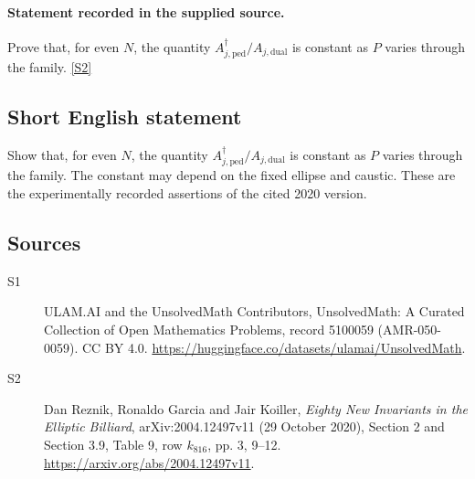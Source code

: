 \documentclass[11pt]{article}
\newcommand{\sref}[2]{\hyperlink{source:#1:#2}{[S#2]}}
\begin{document}
\paragraph{Statement recorded in the supplied source.}
Prove that, for even $N$, the quantity $A_{j,\mathrm{ped}}^\dagger/A_{j,\mathrm{dual}}$ is constant as $P$ varies through the family. \sref{5100059}{2}
\subsection{Short English statement}
Show that, for even $N$, the quantity $A_{j,\mathrm{ped}}^\dagger/A_{j,\mathrm{dual}}$ is constant as $P$ varies through the family. The constant may depend on the fixed ellipse and caustic. These are the experimentally recorded assertions of the cited 2020 version.
\subsection{Sources}
\begin{description}
\item[\hypertarget{source:5100059:1}{S1}] ULAM.AI and the UnsolvedMath Contributors, UnsolvedMath: A Curated Collection of Open Mathematics Problems, record 5100059 (AMR-050-0059). CC BY 4.0. \url{https://huggingface.co/datasets/ulamai/UnsolvedMath}.
\item[\hypertarget{source:5100059:2}{S2}] Dan Reznik, Ronaldo Garcia and Jair Koiller, \emph{Eighty New Invariants in the Elliptic Billiard}, arXiv:2004.12497v11 (29 October 2020), Section 2 and Section 3.9, Table 9, row $k_{816}$, pp. 3, 9--12. \url{https://arxiv.org/abs/2004.12497v11}.
\end{description}
\label{end:5100059}
\end{document}
